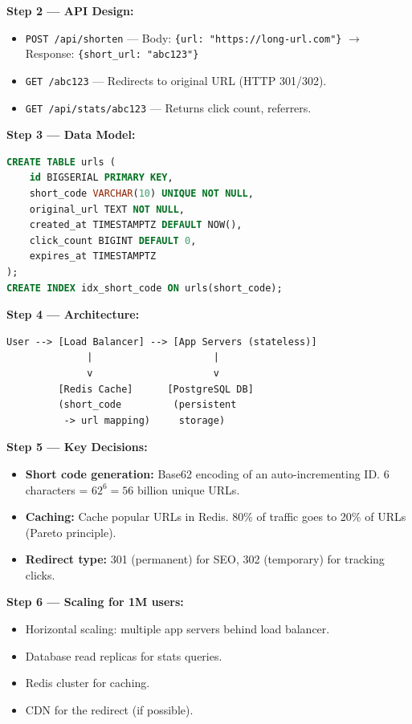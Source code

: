 \documentclass[12pt, a4paper, oneside]{book}
\begin{document}
\textbf{Step 2 --- API Design:}
\begin{itemize}[leftmargin=2em]
    \item \texttt{POST /api/shorten} --- Body: \texttt{\{url: "https://long-url.com"\}} $\to$ Response: \texttt{\{short\_url: "abc123"\}}
    \item \texttt{GET /abc123} --- Redirects to original URL (HTTP 301/302).
    \item \texttt{GET /api/stats/abc123} --- Returns click count, referrers.
\end{itemize}

\textbf{Step 3 --- Data Model:}
\begin{lstlisting}[language=SQL, caption={URL shortener schema}]
CREATE TABLE urls (
    id BIGSERIAL PRIMARY KEY,
    short_code VARCHAR(10) UNIQUE NOT NULL,
    original_url TEXT NOT NULL,
    created_at TIMESTAMPTZ DEFAULT NOW(),
    click_count BIGINT DEFAULT 0,
    expires_at TIMESTAMPTZ
);
CREATE INDEX idx_short_code ON urls(short_code);
\end{lstlisting}

\textbf{Step 4 --- Architecture:}
\begin{verbatim}
User --> [Load Balancer] --> [App Servers (stateless)]
              |                     |
              v                     v
         [Redis Cache]      [PostgreSQL DB]
         (short_code         (persistent
          -> url mapping)     storage)
\end{verbatim}

\textbf{Step 5 --- Key Decisions:}
\begin{itemize}[leftmargin=2em]
    \item \textbf{Short code generation:} Base62 encoding of an auto-incrementing ID. 6 characters = $62^6 = 56$ billion unique URLs.
    \item \textbf{Caching:} Cache popular URLs in Redis. 80\% of traffic goes to 20\% of URLs (Pareto principle).
    \item \textbf{Redirect type:} 301 (permanent) for SEO, 302 (temporary) for tracking clicks.
\end{itemize}

\textbf{Step 6 --- Scaling for 1M users:}
\begin{itemize}[leftmargin=2em]
    \item Horizontal scaling: multiple app servers behind load balancer.
    \item Database read replicas for stats queries.
    \item Redis cluster for caching.
    \item CDN for the redirect (if possible).
\end{itemize}
\end{document}

